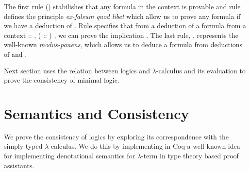 The first rule () stabilishes that any formula in the context is provable and rule  defines
the principle \emph{ex-falsum quod libet} which allow us to prove any formula if we have a deduction of .
Rule  specifies that from a deduction of a formula  from a context  :: ,  ( :: ) ,
we can prove the implication   . The last rule, , represents the well-known \emph{modus-ponens},
which allows us to deduce a formula  from deductions of    and .


Next section uses the relation between logics and $\lambda$-calculus and its evaluation to prove the consistency of
minimal logic.
\begin{coqdoccode}
\coqdocemptyline
\coqdocemptyline
\end{coqdoccode}
 \section{Semantics and Consistency}\label{sec:semantics}


We prove the consistency of logics by exploring its correspondence with the simply typed
$\lambda$-calculus. We do this by implementing in Coq a well-known idea ~\cite{Augustsson99anexercise}
for implementing denotational semantics for $\lambda$-term in type theory based proof assistants.


